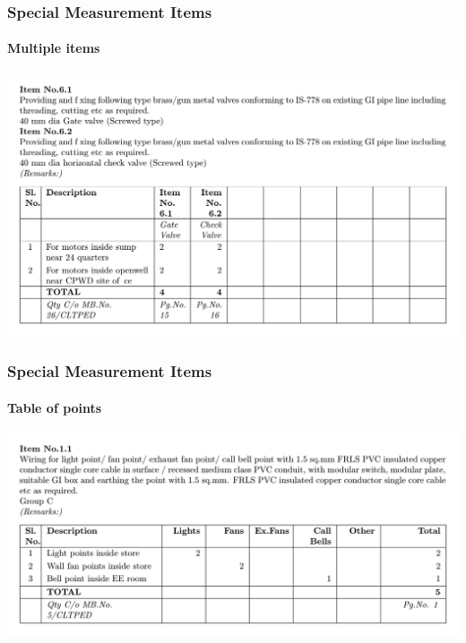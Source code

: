 \documentclass{beamer}
\begin{document}
\begin{frame}
  \frametitle{Special Measurement Items}
  \framesubtitle{Multiple items}
  \begin{block}{}
    \centering
    \includegraphics[width=1\linewidth]{figures/measurementNNNNNN.pdf}
  \end{block}
\end{frame}

\begin{frame}
  \frametitle{Special Measurement Items}
  \framesubtitle{Table of points}
  \begin{block}{}
    \centering
    \includegraphics[width=1\linewidth]{figures/measurement_points.pdf}
  \end{block}
\end{frame}
\end{document}
